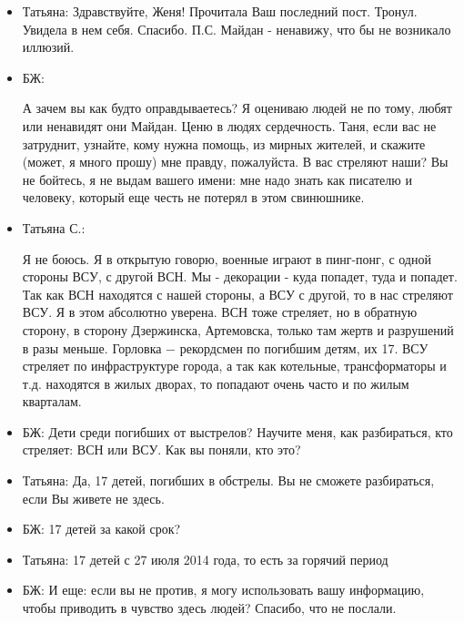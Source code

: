 \begin{itemize}

\item Татьяна: Здравствуйте, Женя! Прочитала Ваш последний пост. Тронул. Увидела в
нем себя. Спасибо. П.С. Майдан - ненавижу, что бы не возникало иллюзий.

\item БЖ: 

А зачем вы как будто оправдываетесь? Я оцениваю людей не по тому, любят или
ненавидят они Майдан. Ценю в людях сердечность. Таня, если вас не затруднит,
узнайте, кому нужна помощь, из мирных жителей, и скажите (может, я много прошу)
мне правду, пожалуйста. В вас стреляют наши? Вы не бойтесь, я не выдам вашего
имени: мне надо знать как писателю и человеку, который еще честь не потерял в
этом свинюшнике.

\item Татьяна С.: 

Я не боюсь. Я в открытую говорю, военные играют в пинг-понг, с
одной стороны ВСУ, с другой ВСН. Мы - декорации - куда попадет, туда и попадет.
Так как ВСН находятся с нашей стороны, а ВСУ с другой, то в нас стреляют ВСУ. Я
в этом абсолютно уверена. ВСН тоже стреляет, но в обратную сторону, в сторону
Дзержинска, Артемовска, только там жертв и разрушений в разы меньше. Горловка −
рекордсмен по погибшим детям, их 17. ВСУ стреляет по инфраструктуре города, а
так как котельные, трансформаторы и т.д. находятся в жилых дворах, то попадают
очень часто и по жилым кварталам.

\item БЖ: Дети среди погибших от выстрелов? Научите меня, как разбираться, кто стреляет: ВСН или ВСУ. Как вы поняли, кто это? 

\item Татьяна: Да, 17 детей, погибших в обстрелы. Вы не сможете разбираться, если Вы живете не здесь.

\item БЖ: 17 детей за какой срок?

\item Татьяна: 17 детей с 27 июля 2014 года, то есть за горячий период

\item БЖ: И еще: если вы не против, я могу использовать вашу информацию, чтобы
приводить в чувство здесь людей? Спасибо, что не послали.


\end{itemize}
